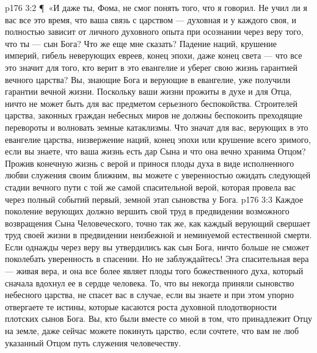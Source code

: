 \vs p176 3:2 \P\ «И даже ты, Фома, не смог понять того, что я говорил. Не учил ли я вас все это время, что ваша связь с царством --- духовная и у каждого своя, и полностью зависит от личного духовного опыта при осознании через веру того, что ты --- сын Бога? Что же еще мне сказать? Падение наций, крушение империй, гибель неверующих евреев, конец эпохи, даже конец света --- что все это значит для того, кто верит в это евангелие и уберег свою жизнь гарантией вечного царства? Вы, знающие Бога и верующие в евангелие, уже получили гарантии вечной жизни. Поскольку ваши жизни прожиты в духе и для Отца, ничто не может быть для вас предметом серьезного беспокойства. Строителей царства, законных граждан небесных миров не должны беспокоить преходящие перевороты и волновать земные катаклизмы. Что значат для вас, верующих в это евангелие царства, низвержение наций, конец эпохи или крушение всего зримого, если вы знаете, что ваша жизнь есть дар Сына и что она вечно хранима Отцом? Прожив конечную жизнь с верой и принося плоды духа в виде исполненного любви служения своим ближним, вы можете с уверенностью ожидать следующей стадии вечного пути с той же самой спасительной верой, которая провела вас через полный событий первый, земной этап сыновства у Бога.
\vs p176 3:3 Каждое поколение верующих должно вершить свой труд в предвидении возможного возвращения Сына Человеческого, точно так же, как каждый верующий свершает труд своей жизни в предвидении неизбежной и неминуемой естественной смерти. Если однажды через веру вы утвердились как сын Бога, ничто больше не сможет поколебать уверенность в спасении. Но не заблуждайтесь! Эта спасительная вера --- живая вера, и она все более являет плоды того божественного духа, который сначала вдохнул ее в сердце человека. То, что вы некогда приняли сыновство небесного царства, не спасет вас в случае, если вы знаете и при этом упорно отвергаете те истины, которые касаются роста духовной плодотворности плотских сынов Бога. Вы, кто были вместе со мной в том, что принадлежит Отцу на земле, даже сейчас можете покинуть царство, если сочтете, что вам не люб указанный Отцом путь служения человечеству.
